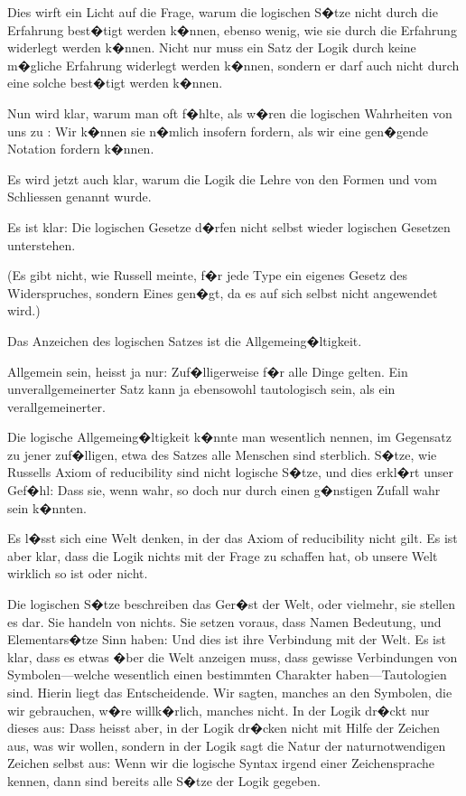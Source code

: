 {Dies wirft ein Licht auf die Frage, warum die
logischen S�tze nicht durch die Erfahrung best�tigt
werden k�nnen, ebenso wenig, wie sie durch die
Erfahrung widerlegt werden k�nnen. Nicht nur
muss ein Satz der Logik durch keine m�gliche Erfahrung
widerlegt werden k�nnen, sondern er darf auch
nicht durch eine solche best�tigt werden k�nnen.}


{Nun wird klar, warum man oft f�hlte, als w�ren
die \glqq{}logischen Wahrheiten\grqq{} von uns zu \glqq{}\grqq{}:
Wir k�nnen sie n�mlich insofern fordern, als wir
eine gen�gende Notation fordern k�nnen.}


{Es wird jetzt auch klar, warum die Logik die
Lehre von den Formen und vom Schliessen genannt
wurde.}


{Es ist klar: Die logischen Gesetze d�rfen nicht
selbst wieder logischen Gesetzen unterstehen.

(Es gibt nicht, wie Russell meinte, f�r jede
\glqq{}Type\grqq{} ein eigenes Gesetz des Widerspruches,
sondern Eines gen�gt, da es auf sich selbst nicht
angewendet wird.)}


{Das Anzeichen des logischen Satzes ist 
die Allgemeing�ltigkeit.

Allgemein sein, heisst ja nur: Zuf�lligerweise
f�r alle Dinge gelten. Ein unverallgemeinerter
Satz kann ja ebensowohl tautologisch sein, als ein
verallgemeinerter.}


{Die logische Allgemeing�ltigkeit k�nnte man
wesentlich nennen, im Gegensatz zu jener zuf�lligen,
etwa des Satzes \glqq{}alle Menschen sind sterblich\grqq{}.
S�tze, wie Russells \glqq{}Axiom of reducibility\grqq{} sind
nicht logische S�tze, und dies erkl�rt unser Gef�hl:
Dass sie, wenn wahr, so doch nur durch einen
g�nstigen Zufall wahr sein k�nnten.}


{Es l�sst sich eine Welt denken, in der das
Axiom of reducibility nicht gilt. Es ist aber klar,
dass die Logik nichts mit der Frage zu schaffen
hat, ob unsere Welt wirklich so ist oder nicht.}


{Die logischen S�tze beschreiben das Ger�st der
Welt, oder vielmehr, sie stellen es dar. Sie
\glqq{}handeln\grqq{} von nichts. Sie setzen voraus, dass
Namen Bedeutung, und Elementars�tze Sinn
haben: Und dies ist ihre Verbindung mit der
Welt. Es ist klar, dass es etwas �ber die Welt
anzeigen muss, dass gewisse Verbindungen von
Symbolen---welche wesentlich einen bestimmten
Charakter haben---Tautologien sind. Hierin liegt
das Entscheidende. Wir sagten, manches an
den Symbolen, die wir gebrauchen, w�re willk�rlich,
manches nicht. In der Logik dr�ckt nur
dieses aus: Dass heisst aber, in der Logik dr�cken
nicht  mit Hilfe der Zeichen aus, was wir
wollen, sondern in der Logik sagt die Natur der
naturnotwendigen Zeichen selbst aus: Wenn wir die
logische Syntax irgend einer Zeichensprache kennen,
dann sind bereits alle S�tze der Logik gegeben.}



